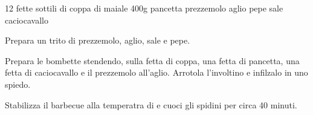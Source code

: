 \begin{ingreds}
	12 fette sottili di coppa di maiale 
	400g pancetta 
	prezzemolo 
	aglio
	pepe
	sale
	caciocavallo 

\end{ingreds}

\begin{method}
Prepara un trito di prezzemolo, aglio, sale e pepe.

Prepara le bombette stendendo, sulla fetta di coppa, una fetta di pancetta, una fetta di caciocavallo e il prezzemolo all'aglio. Arrotola l'involtino e infilzalo in uno spiedo.

Stabilizza il barbecue alla temperatra di  e cuoci gli spidini per circa 40 minuti.
\end {method}
